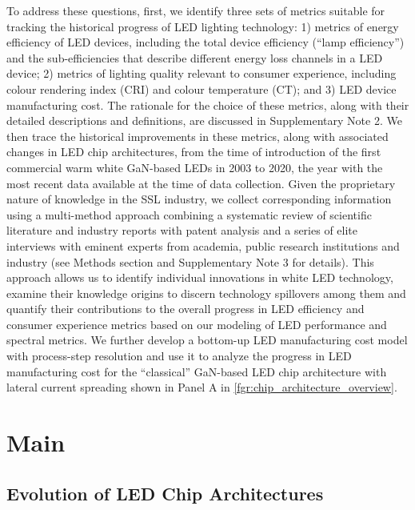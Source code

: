 \documentclass[parskip=full]{article}
\begin{document}
To address these questions, first, we identify three sets of metrics suitable for tracking the historical progress of LED lighting technology: 1) metrics of energy efficiency of LED devices, including the total device efficiency (“lamp efficiency”) and the sub-efficiencies that describe different energy loss channels in a LED device; 2) metrics of lighting quality relevant to consumer experience, including colour rendering index (CRI) and colour temperature (CT); and 3) LED device manufacturing cost. The rationale for the choice of these metrics, along with their detailed descriptions and definitions, are discussed in Supplementary Note 2. We then trace the historical improvements in these metrics, along with associated changes in LED chip architectures, from the time of introduction of the first commercial warm white GaN-based LEDs in 2003 to 2020, the year with the most recent data available at the time of data collection. Given the proprietary nature of knowledge in the SSL industry, we collect corresponding information using a multi-method approach combining a systematic review of scientific literature and industry reports with patent analysis and a series of elite interviews \cite{tansey2009process} with eminent experts from academia, public research institutions and industry (see Methods section and Supplementary Note 3 for details). This approach allows us to identify individual innovations in white LED technology, examine their knowledge origins to discern technology spillovers among them and quantify their contributions to the overall progress in LED efficiency and consumer experience metrics based on our modeling of LED performance and spectral metrics. We further develop a bottom-up LED manufacturing cost model with process-step resolution and use it to analyze the progress in LED manufacturing cost for the “classical” GaN-based LED chip architecture with lateral current spreading shown in Panel A in \cref{fgr:chip_architecture_overview}.

\section{Main}

\subsection{Evolution of LED Chip Architectures}
\end{document}
